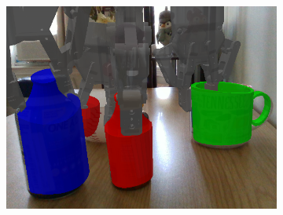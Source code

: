 \documentclass{article}
\begin{document}
\begin{figure}[]
\begin{subfigure}{(\linewidth - 0.05\linewidth)/5}
        \includegraphics[width=\linewidth]{figures/real2sim2real/7/4.png}
    \end{subfigure}


\end{figure}
\end{document}
